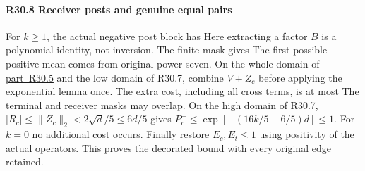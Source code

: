 \paragraph{R30.8 Receiver posts and genuine equal pairs}
For $k\ge1$, the actual negative post block has
Here extracting a factor $B$ is a polynomial identity, not inversion.
The finite mask gives
The first possible positive mean comes from original power seven.
On the whole domain of \mbox{\hyperref[part:R30.5]{part R30.5}} and the low domain of R30.7,
combine $V+Z_c$ before applying the exponential lemma once. The
extra cost, including all cross terms, is at most
The terminal and receiver masks may overlap.
On the high domain of R30.7,
$|R_c|\le\|Z_c\|_2<2\sqrt d/5\le6d/5$ gives
$P_c^-\le\exp[-(16k/5-6/5)d]\le1$.
For $k=0$ no additional cost occurs. Finally restore $E_c,E_t\le1$
using positivity of the actual operators. This proves the decorated
bound with every original edge retained.
